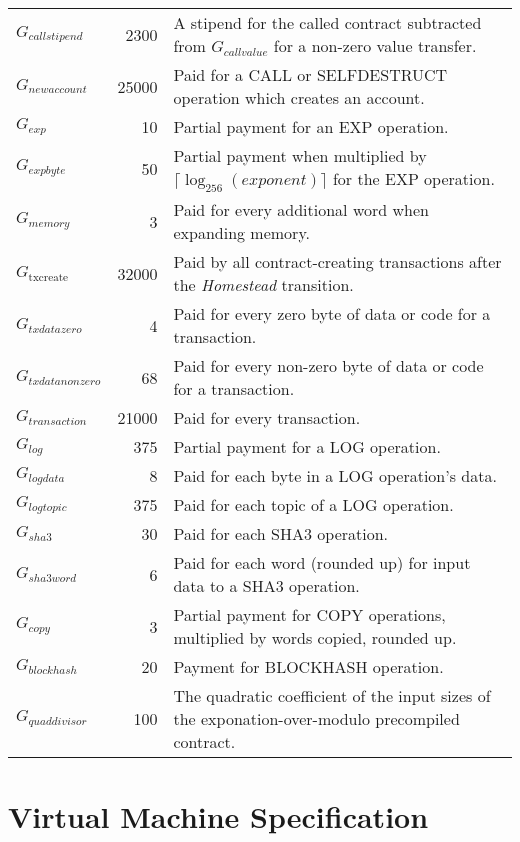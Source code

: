 \documentclass[9pt,oneside]{amsart}
\begin{document}
\begin{tabular*}{\columnwidth}[h]{lrl}
$G_{callstipend}$ & 2300 & A stipend for the called contract subtracted from $G_{callvalue}$ for a non-zero value transfer. \\
$G_{newaccount}$ & 25000 & Paid for a {\small CALL} or {\small SELFDESTRUCT} operation which creates an account. \\
$G_{exp}$ & 10 & Partial payment for an {\small EXP} operation. \\
$G_{expbyte}$ & 50 & Partial payment when multiplied by $\lceil\log_{256}(exponent)\rceil$ for the {\small EXP} operation. \\
$G_{memory}$ & 3 & Paid for every additional word when expanding memory. \\
$G_\text{txcreate}$ & 32000 & Paid by all contract-creating transactions after the {\textit{Homestead} transition}.\\
$G_{txdatazero}$ & 4 & Paid for every zero byte of data or code for a transaction. \\
$G_{txdatanonzero}$ & 68 & Paid for every non-zero byte of data or code for a transaction. \\
$G_{transaction}$ & 21000 & Paid for every transaction. \\
$G_{log}$ & 375 & Partial payment for a {\small LOG} operation. \\
$G_{logdata}$ & 8 & Paid for each byte in a {\small LOG} operation's data. \\
$G_{logtopic}$ & 375 & Paid for each topic of a {\small LOG} operation. \\
$G_{sha3}$ & 30 & Paid for each {\small SHA3} operation. \\
$G_{sha3word}$ & 6 & Paid for each word (rounded up) for input data to a {\small SHA3} operation. \\
$G_{copy}$ & 3 & Partial payment for {\small *COPY} operations, multiplied by words copied, rounded up. \\
$G_{blockhash}$ & 20 & Payment for {\small BLOCKHASH} operation. \\
$G_{quaddivisor}$ & 100 & The quadratic coefficient of the input sizes of the exponation-over-modulo precompiled contract. \\

\bottomrule
\end{tabular*}

\section{Virtual Machine Specification}\label{app:vm}
\end{document}
